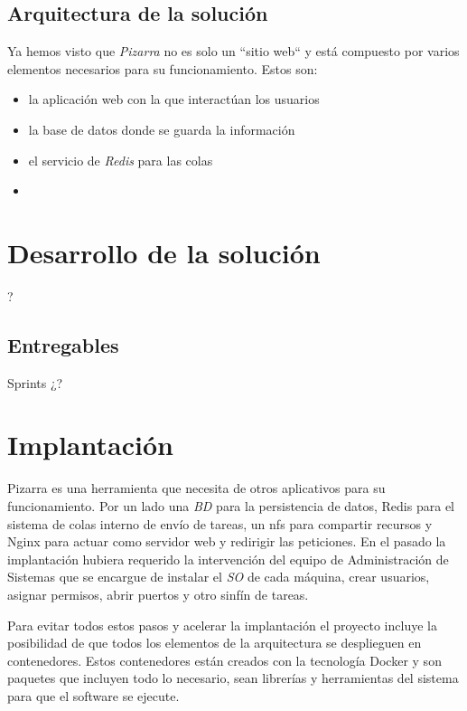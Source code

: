 \documentclass[11pt,spanish,listoffigures,listoftables]{tfgetsinf}
\begin{document}
\section{Arquitectura de la solución}

Ya hemos visto que \textit{Pizarra} no es solo un ``sitio web`` y está compuesto por varios elementos necesarios para su funcionamiento. Estos son:

\begin{itemize}
	\item la aplicación web con la que interactúan los usuarios
	\item la base de datos donde se guarda la información
	\item el servicio de \textit{Redis} para las \Gls{cola}s
	\item 
\end{itemize} 


\chapter{Desarrollo de la solución}

?

\section{Entregables}

Sprints ¿?

\chapter{Implantación}

Pizarra es una herramienta que necesita de otros aplicativos para su funcionamiento. Por un lado una \textit{BD} para la persistencia de datos, Redis para el sistema de colas interno de envío de tareas, un \acrshort{nfs} para compartir recursos y Nginx para actuar como servidor web y redirigir las peticiones. En el pasado la implantación hubiera requerido la intervención del equipo de Administración de Sistemas que se encargue de instalar el \textit{SO} de cada máquina, crear usuarios, asignar permisos, abrir puertos y otro sinfín de tareas.

Para evitar todos estos pasos y acelerar la implantación el proyecto incluye la posibilidad de que todos los elementos de la arquitectura se desplieguen en \Gls{contenedor}es. Estos \Gls{contenedor}es están creados con la tecnología Docker y son paquetes que incluyen todo lo necesario, sean librerías y herramientas del sistema para que el software se ejecute.
\end{document}
